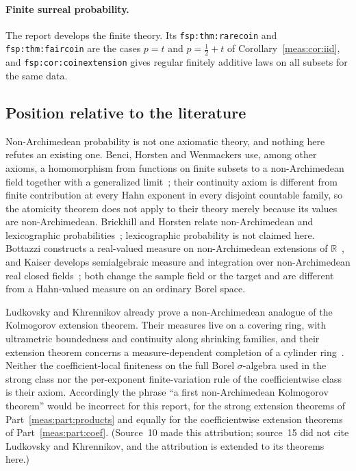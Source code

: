 \documentclass[11pt]{article}
\numberwithin{equation}{section}
\theoremstyle{definition}
\theoremstyle{remark}
\newcommand{\R}{\mathbb R}
\begin{document}
\paragraph{Finite surreal probability.}
The report  develops the finite
theory. Its \texttt{fsp:thm:rarecoin} and \texttt{fsp:thm:faircoin} are the
cases $p=t$ and $p=\tfrac12+t$ of Corollary~\ref{meas:cor:iid}, and
\texttt{fsp:cor:coinextension} gives regular finitely additive laws on all
subsets for the same data.

\subsection{Position relative to the literature}\label{meas:sub:literature}

Non-Archimedean probability is not one axiomatic theory, and nothing here
refutes an existing one. Benci, Horsten and Wenmackers use, among other axioms,
a homomorphism from functions on finite subsets to a non-Archimedean field
together with a generalized limit~\cite{BHW}; their continuity axiom is
different from finite contribution at every Hahn exponent in every disjoint
countable family, so the atomicity theorem does not apply to their theory
merely because its values are non-Archimedean. Brickhill and Horsten relate
non-Archimedean and lexicographic probabilities~\cite{BH}; lexicographic
probability is not claimed here. Bottazzi constructs a real-valued measure on
non-Archimedean extensions of $\R$~\cite{Bottazzi}, and Kaiser develops
semialgebraic measure and integration over non-Archimedean real closed
fields~\cite{Kaiser}; both change the sample field or the target and are
different from a Hahn-valued measure on an ordinary Borel space.

Ludkovsky and Khrennikov already prove a non-Archimedean analogue of the
Kolmogorov extension theorem. Their measures live on a covering ring, with
ultrametric boundedness and continuity along shrinking families, and their
extension theorem concerns a measure-dependent completion of a cylinder
ring~\cite[Definitions 2.1--2.4 and Theorem 2.15.2]{LK}. Neither the
coefficient-local finiteness on the full Borel $\sigma$-algebra used in the
strong class nor the per-exponent finite-variation rule of the coefficientwise
class is their axiom. Accordingly the phrase ``a first non-Archimedean
Kolmogorov theorem'' would be incorrect for this report, for the strong
extension theorems of Part~\ref{meas:part:products} and equally for the
coefficientwise extension theorems of Part~\ref{meas:part:coef}. (Source~10
made this attribution; source~15 did not cite Ludkovsky and Khrennikov, and
the attribution is extended to its theorems here.)
\end{document}
